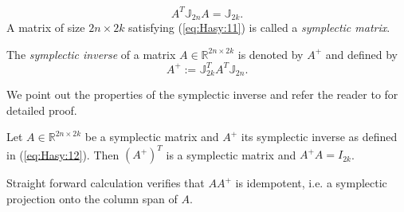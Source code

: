 \begin{equation} \label{eq:Hasy:11}
	A^T \mathbb{J}_{2n}A = \mathbb{J}_{2k}.
\end{equation}
A matrix of size $2n\times 2k$ satisfying (\ref{eq:Hasy:11}) is called a \emph{symplectic matrix}.

\begin{definition}
	The \emph{symplectic inverse} of a matrix $A\in \mathbb{R}^{2n\times 2k}$ is denoted by $A^+$ and defined by {\edit \cite{Peng:2014di}}
\begin{equation}\label{eq:Hasy:12}
	A^+ := \mathbb{J}_{2k}^T A^T \mathbb{J}_{2n}.
\end{equation}
\end{definition}
We point out the properties of the symplectic inverse and refer the reader to \cite{Peng:2014di} for detailed proof.
\begin{lemma} \label{lemma:Hasy:1}
Let $A\in \mathbb{R}^{2n\times 2k}$ be a symplectic matrix and $A^+$ its symplectic inverse as defined in (\ref{eq:Hasy:12}). Then ${(A^+)}^T$ is a symplectic matrix and $A^+A = I_{2k}$.
\end{lemma}

{\edit Straight forward calculation verifies} that $AA^+$ is idempotent, i.e. a symplectic projection onto the column span of $A$.

